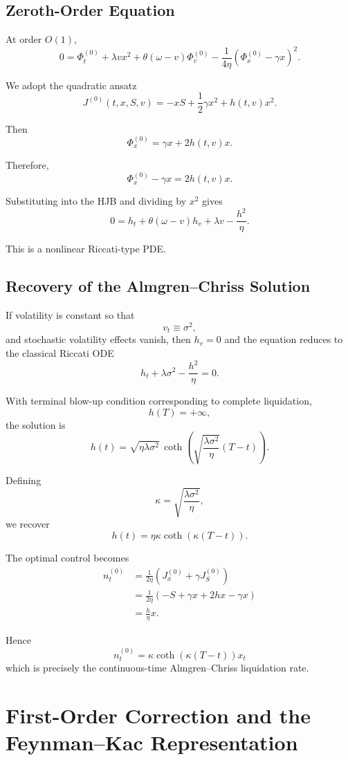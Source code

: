 \documentclass[11pt]{article}
\begin{document}
\subsection{Zeroth-Order Equation}

At order $O(1)$,
\[
0
=
\Phi_t^{(0)}
+
\lambda vx^2
+
\theta(\omega-v)\Phi_v^{(0)}
-
\frac{1}{4\eta}
\left(
\Phi_x^{(0)}-\gamma x
\right)^2.
\]

We adopt the quadratic ansatz
\[
\boxed{
J^{(0)}(t,x,S,v)
=
-xS
+
\frac12\gamma x^2
+
h(t,v)x^2
}.
\]

Then
\[
\Phi_x^{(0)}
=
\gamma x + 2h(t,v)x.
\]

Therefore,
\[
\Phi_x^{(0)}-\gamma x
=
2h(t,v)x.
\]

Substituting into the HJB and dividing by $x^2$ gives
\[
0
=
h_t
+
\theta(\omega-v)h_v
+
\lambda v
-
\frac{h^2}{\eta}.
\]

This is a nonlinear Riccati-type PDE.

\subsection{Recovery of the Almgren--Chriss Solution}

If volatility is constant so that
\[
v_t \equiv \sigma^2,
\]
and stochastic volatility effects vanish, then $h_v=0$ and the equation reduces to the classical Riccati ODE
\[
\boxed{
 h_t
 +
 \lambda\sigma^2
 -
 \frac{h^2}{\eta}
 =0
 }.
\]

With terminal blow-up condition corresponding to complete liquidation,
\[
h(T)=+\infty,
\]
the solution is
\[
\boxed{
 h(t)
 =
 \sqrt{\eta\lambda\sigma^2}
 \,
 \coth
 \left(
 \sqrt{\frac{\lambda\sigma^2}{\eta}}
 (T-t)
 \right)
 }.
\]

Defining
\[
\kappa
=
\sqrt{\frac{\lambda\sigma^2}{\eta}},
\]
we recover
\[
h(t)=\eta\kappa\coth(\kappa(T-t)).
\]

The optimal control becomes
\begin{align*}
n_t^{(0)}
&=
\frac{1}{2\eta}
\left(J_x^{(0)}+\gamma J_S^{(0)}\right)
\\
&=
\frac{1}{2\eta}
\left(-S+\gamma x+2hx-\gamma x\right)
\\
&=
\frac{h}{\eta}x.
\end{align*}

Hence
\[
\boxed{
 n_t^{(0)}
 =
 \kappa
 \coth(\kappa(T-t))x_t
 }
\]
which is precisely the continuous-time Almgren--Chriss liquidation rate.

\section{First-Order Correction and the Feynman--Kac Representation}
\end{document}
